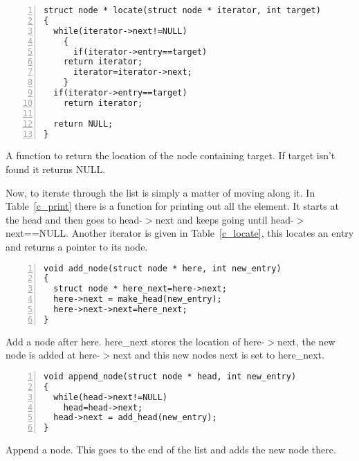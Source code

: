 \documentclass[11pt,a4paper]{scrartcl}
\begin{document}
\begin{table}
\begin{lstlisting}[numbers=left]
struct node * locate(struct node * iterator, int target)
{
  while(iterator->next!=NULL)
    {
      if(iterator->entry==target)
	return iterator;
      iterator=iterator->next;
    }
  if(iterator->entry==target)
    return iterator;

  return NULL;
}
\end{lstlisting}
\caption{A function to return the location of the node containing target. If target isn't found it returns NULL.\label{c_locate}}
\end{table}


Now, to iterate through the list is simply a matter of moving along
it. In Table~\ref{c_print} there is a function for printing out all
the element. It starts at the head and then goes to head-$>$next and
keeps going until head-$>$next==NULL. Another iterator is given in
Table~\ref{c_locate}, this locates an entry and returns a pointer to
its node.


\begin{table}
\begin{lstlisting}[numbers=left]
void add_node(struct node * here, int new_entry)
{
  struct node * here_next=here->next;
  here->next = make_head(new_entry);
  here->next->next=here_next;
}
\end{lstlisting}
\caption{Add a node after here. here\_next stores the location of here-$>$next, the new node is added at here-$>$next and this new nodes next is set to here\_next.\label{c_add}}
\end{table}


\begin{table}
\begin{lstlisting}[numbers=left]
void append_node(struct node * head, int new_entry)
{
  while(head->next!=NULL)
    head=head->next;
  head->next = add_head(new_entry);
}
\end{lstlisting}
\caption{Append a node. This goes to the end of the list and adds the
  new node there.\label{c_append}}
\end{table}
\end{document}

